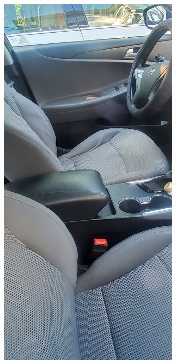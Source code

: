 \documentclass[12pt]{article}
\begin{document}
\begin{figure}[!ht]
\begin{subfigure}[b]{0.4\textwidth}
        \includegraphics[width=\textwidth]{images/car_photos/20210703_192751.jpg} %
        \caption{}
    \end{subfigure}

\end{figure}
\end{document}
